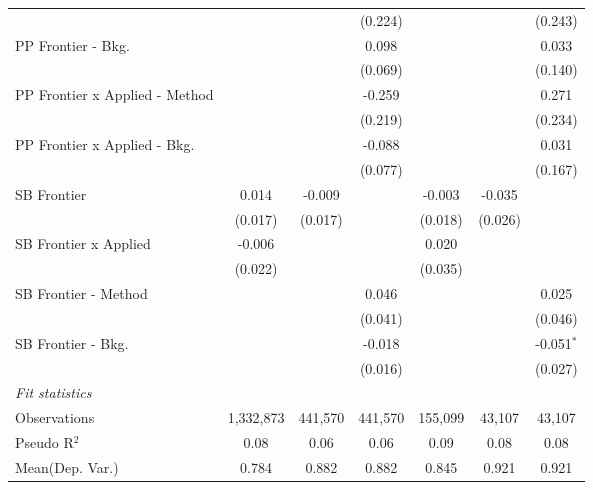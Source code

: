 \begin{tabular}{lcccccc}
                                  &               &               & (0.224)        &         &               & (0.243)\\   
   PP Frontier - Bkg.             &               &               & 0.098          &         &               & 0.033\\   
                                  &               &               & (0.069)        &         &               & (0.140)\\   
   PP Frontier x Applied - Method &               &               & -0.259         &         &               & 0.271\\   
                                  &               &               & (0.219)        &         &               & (0.234)\\   
   PP Frontier x Applied - Bkg.   &               &               & -0.088         &         &               & 0.031\\   
                                  &               &               & (0.077)        &         &               & (0.167)\\   
   SB Frontier                    & 0.014         & -0.009        &                & -0.003  & -0.035        &   \\   
                                  & (0.017)       & (0.017)       &                & (0.018) & (0.026)       &   \\   
   SB Frontier x Applied          & -0.006        &               &                & 0.020   &               &   \\   
                                  & (0.022)       &               &                & (0.035) &               &   \\   
   SB Frontier - Method           &               &               & 0.046          &         &               & 0.025\\   
                                  &               &               & (0.041)        &         &               & (0.046)\\   
   SB Frontier - Bkg.             &               &               & -0.018         &         &               & -0.051$^{*}$\\   
                                  &               &               & (0.016)        &         &               & (0.027)\\   
   \midrule
   \emph{Fit statistics}\\
   Observations                   & 1,332,873     & 441,570       & 441,570        & 155,099 & 43,107        & 43,107\\  
   Pseudo R$^2$                   & 0.08          & 0.06          & 0.06           & 0.09    & 0.08          & 0.08\\  
Mean(Dep. Var.) & 0.784 & 0.882 & 0.882 & 0.845 & 0.921 & 0.921 \\
   

\end{tabular}
